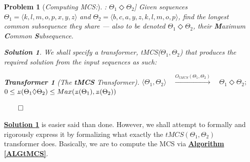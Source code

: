 \documentclass[a4paper, 18pt]{book} %
\newtheorem{transf}{Transformer}
\newtheorem{prob}{Problem}
\newtheorem{soln}{Solution}
\newcommand{\invpi}{\rotatebox[origin=c]{180}{$\pi$}}
\begin{document}
\begin{prob}[\textit{Computing MCS:}]: $\Theta_1 \Diamond \Theta_2$] 
\label{PROBMCS}
Given sequences $\Theta_1 = \langle k, l, m, o, p, x, y, z \rangle$ and $\Theta_2 = \langle b, c, a, y, z, k, l, m, o, p \rangle$, find the longest common subsequence they share --- also to be denoted $\Theta_1 \Diamond \Theta_2$, their \textbf{M}aximum \textbf{C}ommon \textbf{S}ubsequence.

\begin{soln}
\label{SOLMCS}
We shall specify a transformer, tMCS($\Theta_1,\Theta_2$) that produces the required solution from the input sequences as such:

\begin{transf}[The \textbf{tMCS} Transformer]
\label{TRANSFMCS}
$\langle \Theta_1,\Theta_2 \rangle  \quad \xrightarrow{O_{tMCS}(\Theta_1,\Theta_2)} \quad \Theta_1 \Diamond \Theta_2;$\\
$0 \leq \invpi(\Theta_1 \Diamond \Theta_2) \leq Max(\invpi(\Theta_1), \invpi(\Theta_2))$
\end{transf}
$\qed$
\end{soln}
\end{prob}

\textbf{\hyperref[SOLMCS]{Solution \ref{SOLMCS}}} is easier said than done. However, we shall attempt to formally and rigorously express it by formalizing what exactly the $tMCS(\Theta_1,\Theta_2)$ transformer does. Basically, we are to compute the MCS via \textbf{\hyperref[ALGtMCS]{Algorithm \ref{ALGtMCS}}}.
\end{document}
